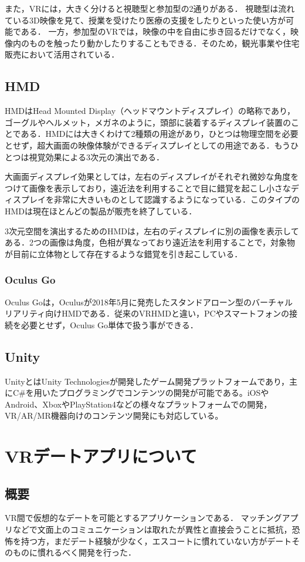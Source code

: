 \documentclass[12pt,a4j,titlepage]{ltjsarticle}
\begin{document}
また，VRには，大きく分けると視聴型と参加型の2通りがある．
視聴型は流れている3D映像を見て、授業を受けたり医療の支援をしたりといった使い方が可能である．
一方，参加型のVRでは，映像の中を自由に歩き回るだけでなく，映像内のものを触ったり動かしたりすることもできる．そのため，観光事業や住宅販売において活用されている．
\subsection{HMD}
HMDはHead Mounted Display（ヘッドマウントディスプレイ）の略称であり，ゴーグルやヘルメット，メガネのように，頭部に装着するディスプレイ装置のことである．HMDには大きくわけて2種類の用途があり，ひとつは物理空間を必要とせず，超大画面の映像体験ができるディスプレイとしての用途である．もうひとつは視覚効果による3次元の演出である．

大画面ディスプレイ効果としては，左右のディスプレイがそれぞれ微妙な角度をつけて画像を表示しており，遠近法を利用することで目に錯覚を起こし小さなディスプレイを非常に大きいものとして認識するようになっている．このタイプのHMDは現在ほとんどの製品が販売を終了している．

3次元空間を演出するためのHMDは，左右のディスプレイに別の画像を表示してある．2つの画像は角度，色相が異なっており遠近法を利用することで，対象物が目前に立体物として存在するような錯覚を引き起こしている．
\subsubsection{Oculus Go}
Oculus Goは，Oculusが2018年5月に発売したスタンドアローン型のバーチャルリアリティ向けHMDである．従来のVRHMDと違い，PCやスマートフォンの接続を必要とせず，Oculus Go単体で扱う事ができる．

\subsection{Unity}
UnityとはUnity Technologiesが開発したゲーム開発プラットフォームであり，主にC\#を用いたプログラミングでコンテンツの開発が可能である。iOSやAndroid、XboxやPlayStation4などの様々なプラットフォームでの開発，VR/AR/MR機器向けのコンテンツ開発にも対応している。
\clearpage

\section{VRデートアプリについて}
\subsection{概要}
VR間で仮想的なデートを可能とするアプリケーションである．
マッチングアプリなどで文面上のコミュニケーションは取れたが異性と直接会うことに抵抗，恐怖を持つ方，まだデート経験が少なく，エスコートに慣れていない方がデートそのものに慣れるべく開発を行った．
\end{document}
